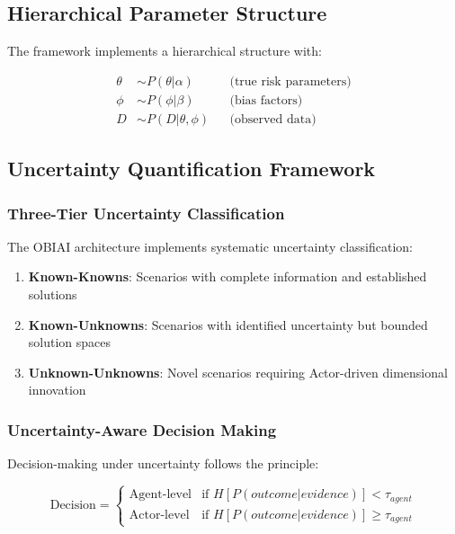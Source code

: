 \documentclass[12pt,a4paper]{article}
\begin{document}
\subsection{Hierarchical Parameter Structure}

The framework implements a hierarchical structure with:

\begin{align}
\theta &\sim P(\theta|\alpha) && \text{(true risk parameters)} \\
\phi &\sim P(\phi|\beta) && \text{(bias factors)} \\
D &\sim P(D|\theta, \phi) && \text{(observed data)}
\end{align}

\subsection{Uncertainty Quantification Framework}

\subsubsection{Three-Tier Uncertainty Classification}

The OBIAI architecture implements systematic uncertainty classification:

\begin{enumerate}
    \item \textbf{Known-Knowns}: Scenarios with complete information and established solutions
    \item \textbf{Known-Unknowns}: Scenarios with identified uncertainty but bounded solution spaces
    \item \textbf{Unknown-Unknowns}: Novel scenarios requiring Actor-driven dimensional innovation
\end{enumerate}

\subsubsection{Uncertainty-Aware Decision Making}

Decision-making under uncertainty follows the principle:

\begin{equation}
\text{Decision} = \begin{cases}
\text{Agent-level} & \text{if } H[P(outcome|evidence)] < \tau_{agent} \\
\text{Actor-level} & \text{if } H[P(outcome|evidence)] \geq \tau_{agent}
\end{cases}
\end{equation}
\end{document}
